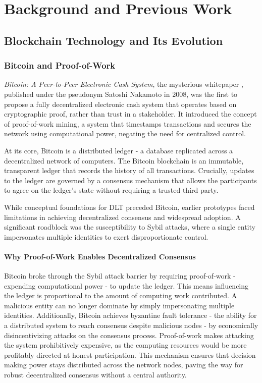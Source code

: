\documentclass[11pt]{report}
\begin{document}
\chapter{Background and Previous Work} \label{ch:previous_work}

\section{Blockchain Technology and Its Evolution}
\subsection{Bitcoin and Proof-of-Work}
\textit{Bitcoin: A Peer-to-Peer Electronic Cash System}, the mysterious whitepaper \cite{nakamotoBitcoinPeertopeerElectronic2008}, published under the pseudonym Satoshi Nakamoto in 2008, was the first to propose a fully decentralized electronic cash system that operates based on cryptographic proof, rather than trust in a stakeholder. It introduced the concept of proof-of-work mining, a system that timestamps transactions and secures the network using computational power, negating the need for centralized control.

At its core, Bitcoin is a distributed ledger - a database replicated across a decentralized network of computers. The Bitcoin blockchain is an immutable, transparent ledger that records the history of all transactions. Crucially, updates to the ledger are governed by a consensus mechanism that allows the participants to agree on the ledger's state without requiring a trusted third party.

While conceptual foundations for \ac{DLT} preceded Bitcoin, earlier prototypes faced limitations in achieving decentralized consensus and widespread adoption. A significant roadblock was the susceptibility to Sybil attacks, where a single entity impersonates multiple identities to exert disproportionate control.

\subsubsection{Why Proof-of-Work Enables Decentralized Consensus}

Bitcoin broke through the Sybil attack barrier by requiring proof-of-work - expending computational power - to update the ledger. This means influencing the ledger is proportional to the amount of computing work contributed. A malicious entity can no longer dominate by simply impersonating multiple identities. Additionally, Bitcoin achieves byzantine fault tolerance - the ability for a distributed system to reach consensus despite malicious nodes - by economically disincentivizing attacks on the consensus process. Proof-of-work makes attacking the system prohibitively expensive, as the computing resources would be more profitably directed at honest participation. This mechanism ensures that decision-making power stays distributed across the network nodes, paving the way for robust decentralized consensus without a central authority.
\end{document}
